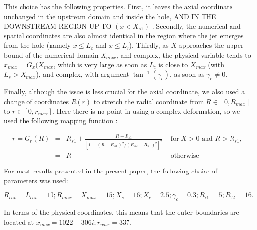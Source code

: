 \documentclass{jfm}
\newcommand\be{\begin{equation}}
\newcommand\ee{\end{equation}}
\begin{document}
This choice has the following properties. First, it leaves the axial coordinate unchanged in the upstream domain and inside the hole,
AND IN THE DOWNSTREAM REGION UP TO $(x<X_{s1})$
. Secondly, the numerical and spatial coordinates are also almost identical in the region where the jet emerges from the hole (namely  $x \leq L_c$ and $x \leq L_s$). Thirdly, as $X$ approaches the upper bound of the numerical domain $X_{max}$, and complex, the 
physical variable tends to $x_{max}= G_x(X_{max}$, which is very large as soon as $L_c$ is close to $X_{max}$
(with $L_s > X_{max}$), and complex, with argument $\tan^{-1} (\gamma_c)$, as soon as $\gamma_c \neq 0$.

Finally, although the issue is less crucial for the axial coordinate, we also used a change of coordinates $R(r)$ to stretch the radial coordinate from $R \in [0,R_{max}]$ to $r \in [0,r_{max}]$. Here there is no point in using a complex deformation, so we used the following mapping function :

\be
\begin{array}{rcll}
r= G_r(R) &=& 
R_{s1} + \displaystyle \frac{R-R_{s1}}{\left[1-(R-R_{s1})^2/(R_{s2}-R_{s1})^2 \right]^2}  & \mbox{ for } X>0 \mbox{ and } R>R_{s1}, \\
	& = & R & \mbox{  otherwise }
\end{array}
\label{eq:mapR}
\ee

For most results presented in the present paper, the following choice of parameters was used: 

$$
R_{cav}=L_{cav}=10 ; R_{max} = X_{max} = 15; X_s = 16 ; X_c = 2.5 ; \gamma_c = 0.3 ; R_{s1} = 5;
R_{s2} = 16.
$$

In terms of the physical coordinates, this means that the outer boundaries are located at
$x_{max} = 1022+306i ; r_{max} = 337$.
 




\end{document}
